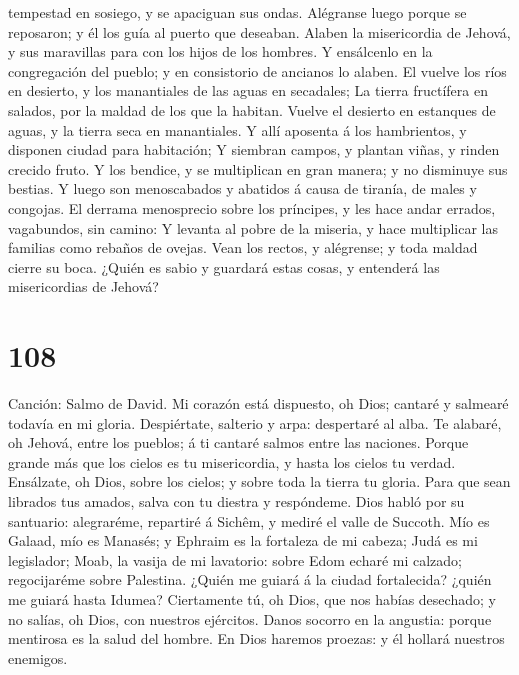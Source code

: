 tempestad en sosiego, y se apaciguan sus ondas. 
Alégranse luego porque se reposaron; y él los guía al puerto que
deseaban.  Alaben la misericordia de Jehová, y sus
maravillas para con los hijos de los hombres.  Y
ensálcenlo en la congregación del pueblo; y en consistorio de ancianos
lo alaben.  El vuelve los ríos en desierto, y los
manantiales de las aguas en secadales;  La tierra
fructífera en salados, por la maldad de los que la habitan.
 Vuelve el desierto en estanques de aguas, y la tierra
seca en manantiales.  Y allí aposenta á los hambrientos,
y disponen ciudad para habitación;  Y siembran campos, y
plantan viñas, y rinden crecido fruto.  Y los bendice, y
se multiplican en gran manera; y no disminuye sus bestias.
 Y luego son menoscabados y abatidos á causa de tiranía,
de males y congojas.  El derrama menosprecio sobre los
príncipes, y les hace andar errados, vagabundos, sin camino:
 Y levanta al pobre de la miseria, y hace multiplicar las
familias como rebaños de ovejas.  Vean los rectos, y
alégrense; y toda maldad cierre su boca.  ¿Quién es sabio
y guardará estas cosas, y entenderá las misericordias de Jehová?

\hypertarget{section-107}{%
\section{108}\label{section-107}}

 Canción: Salmo de David. Mi corazón está dispuesto, oh
Dios; cantaré y salmearé todavía en mi gloria. 
Despiértate, salterio y arpa: despertaré al alba.  Te
alabaré, oh Jehová, entre los pueblos; á ti cantaré salmos entre las
naciones.  Porque grande más que los cielos es tu
misericordia, y hasta los cielos tu verdad.  Ensálzate, oh
Dios, sobre los cielos; y sobre toda la tierra tu gloria. 
Para que sean librados tus amados, salva con tu diestra y respóndeme.
 Dios habló por su santuario: alegraréme, repartiré á
Sichêm, y mediré el valle de Succoth.  Mío es Galaad, mío
es Manasés; y Ephraim es la fortaleza de mi cabeza; Judá es mi
legislador;  Moab, la vasija de mi lavatorio: sobre Edom
echaré mi calzado; regocijaréme sobre Palestina.  ¿Quién
me guiará á la ciudad fortalecida? ¿quién me guiará hasta Idumea?
 Ciertamente tú, oh Dios, que nos habías desechado; y no
salías, oh Dios, con nuestros ejércitos.  Danos socorro
en la angustia: porque mentirosa es la salud del hombre. 
En Dios haremos proezas: y él hollará nuestros enemigos.

